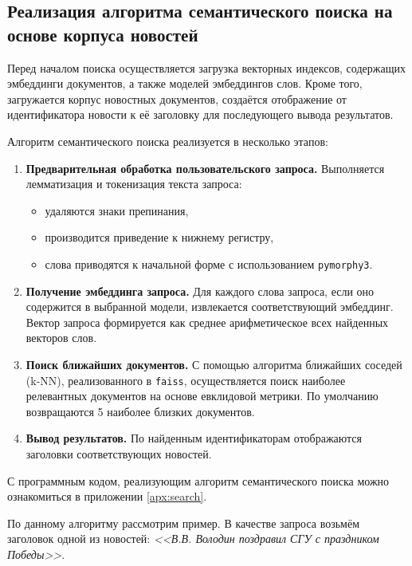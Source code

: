 \documentclass[coursework]{SCWorks}
\begin{document}
\subsection{Реализация алгоритма семантического поиска на основе корпуса новостей}

Перед началом поиска осуществляется загрузка векторных индексов, содержащих эмбеддинги документов, а также моделей эмбеддингов слов. Кроме того, загружается корпус новостных документов, создаётся отображение от идентификатора новости к её заголовку для последующего вывода результатов.

Алгоритм семантического поиска реализуется в несколько этапов:
\begin{enumerate}
    \item \textbf{Предварительная обработка пользовательского запроса.}
    Выполняется лемматизация и токенизация текста запроса:
    \begin{itemize}
        \item удаляются знаки препинания,
        \item производится приведение к нижнему регистру,
        \item слова приводятся к начальной форме с использованием \texttt{pymorphy3}.
    \end{itemize}

    \item \textbf{Получение эмбеддинга запроса.}
    Для каждого слова запроса, если оно содержится в выбранной модели, извлекается соответствующий эмбеддинг. Вектор запроса формируется как среднее арифметическое всех найденных векторов слов.

    \item \textbf{Поиск ближайших документов.}
    С помощью алгоритма ближайших соседей (k-NN), реализованного в \texttt{faiss}, осуществляется поиск наиболее релевантных документов на основе евклидовой метрики. По умолчанию возвращаются 5 наиболее близких документов.

    \item \textbf{Вывод результатов.}
    По найденным идентификаторам отображаются заголовки соответствующих новостей.
\end{enumerate}

С программным кодом, реализующим алгоритм семантического поиска можно ознакомиться в приложении \ref{apx:search}.

По данному алгоритму рассмотрим пример. В качестве запроса возьмём заголовок одной из новостей: \textit{<<В.В. Володин поздравил СГУ с праздником Победы>>}.
\end{document}
